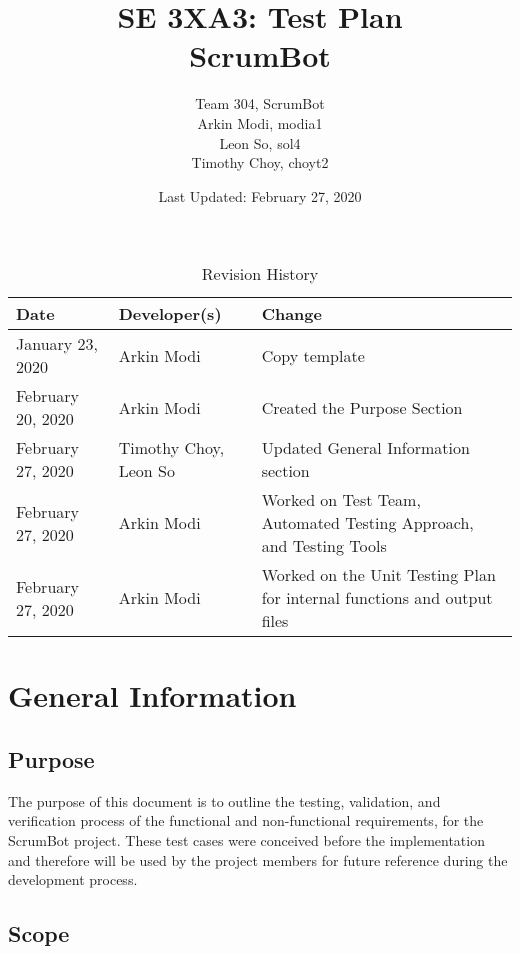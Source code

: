 \documentclass[12pt, titlepage]{article}
\title{SE 3XA3: Test Plan\\ScrumBot}
\author{
    Team 304, ScrumBot
        \\ Arkin Modi, modia1
        \\ Leon So, sol4
        \\ Timothy Choy, choyt2
}
\date{Last Updated: February 27, 2020}
\begin{document}
\newpage
\maketitle

\tableofcontents
\listoftables
\listoffigures

\newpage

\begin{table}[!h]
    \caption{Revision History} \label{TblRevisionHistory}
    \begin{tabularx}{\textwidth}{llX}
        \toprule
            \textbf{Date} & \textbf{Developer(s)} & \textbf{Change}\\
        \midrule
            January 23, 2020 & Arkin Modi & Copy template\\
            February 20, 2020 & Arkin Modi & Created the Purpose Section\\
            February 27, 2020 & Timothy Choy, Leon So & Updated General Information section\\
            February 27, 2020 & Arkin Modi & Worked on Test Team, Automated Testing Approach, and Testing Tools\\
            February 27, 2020 & Arkin Modi & Worked on the Unit Testing Plan for internal functions and output files\\
        \bottomrule
    \end{tabularx}
\end{table}


\newpage


\section{General Information}

\subsection{Purpose}
The purpose of this document is to outline the testing, validation, and verification process of the functional and non-functional requirements, for the ScrumBot project. These test cases were conceived before the implementation and therefore will be used by the project members for future reference during the development process.

\subsection{Scope}
\end{document}
